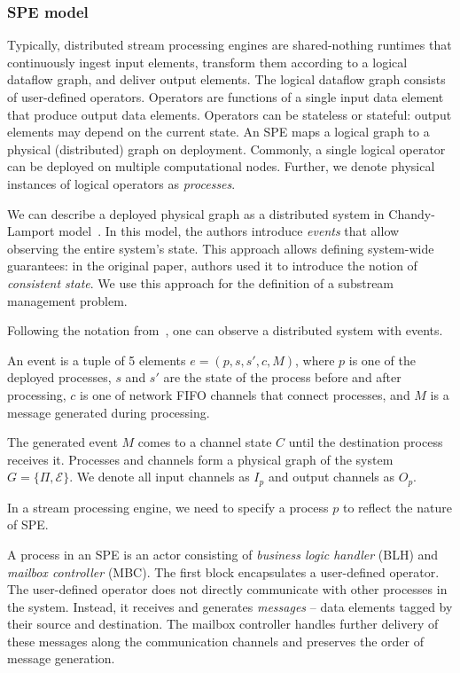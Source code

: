 \subsubsection{SPE model}
\label{fs-acker-spe-model}

Typically, distributed stream processing engines are shared-nothing runtimes that continuously ingest input elements, transform them according to a logical dataflow graph, and deliver output elements. The logical dataflow graph consists of user-defined operators. Operators are functions of a single input data element that produce output data elements. Operators can be stateless or stateful: output elements may depend on the current state. An SPE maps a logical graph to a physical (distributed) graph on deployment. Commonly, a single logical operator can be deployed on multiple computational nodes. Further, we denote physical instances of logical operators as {\em processes}.

We can describe a deployed physical graph as a distributed system in Chandy-Lamport model~\cite{Chandy:1985:DSD:214451.214456, carbone2018scalable}. In this model, the authors introduce \textit{events} that allow observing the entire system's state. This approach allows defining system-wide guarantees: in the original paper, authors used it to introduce the notion of {\em consistent state}. We use this approach for the definition of a substream management problem.

Following the notation from~\cite{Chandy:1985:DSD:214451.214456, carbone2018scalable}, one can observe a distributed system with events. 

\begin{definition}[Event]
An event is a tuple of 5 elements $e = (p, s, s', c, M)$, where $p$ is one of the deployed processes, $s$ and $s'$ are the state of the process before and after processing, $c$ is one of network FIFO channels that connect processes, and $M$ is a message generated during processing.
\end{definition}

The generated event $M$ comes to a channel state $C$ until the destination process receives it. Processes and channels form a physical graph of the system $G=\{\Pi,\mathcal{E}\}$. We denote all input channels as $I_p$ and output channels as $O_p$.

In a stream processing engine, we need to specify a process $p$ to reflect the nature of SPE. 

\begin{definition}[Process]
A process in an SPE is an actor consisting of {\em business logic handler} (BLH) and {\em mailbox controller} (MBC). The first block encapsulates a user-defined operator. The user-defined operator does not directly communicate with other processes in the system. Instead, it receives and generates {\em messages} -- data elements tagged by their source and destination. The mailbox controller handles further delivery of these messages along the communication channels and preserves the order of message generation.
\end{definition}

